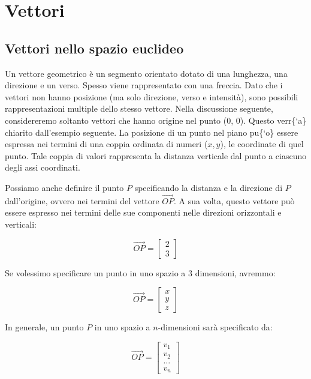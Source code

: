 \documentclass[
  11pt,
]{krantz}
\theoremstyle{definition}
\theoremstyle{definition}
\theoremstyle{definition}
\theoremstyle{definition}
\theoremstyle{remark}
\begin{document}
\hypertarget{vettori}{%
\section{Vettori}\label{vettori}}

\hypertarget{vettori-nello-spazio-euclideo}{%
\subsection{Vettori nello spazio euclideo}\label{vettori-nello-spazio-euclideo}}

Un vettore geometrico è un segmento orientato dotato di una lunghezza, una direzione e un verso. Spesso viene rappresentato con una freccia. Dato che i vettori non hanno posizione (ma solo direzione, verso e intensità), sono possibili rappresentazioni multiple dello stesso vettore. Nella discussione seguente, considereremo soltanto vettori che hanno origine nel punto (0, 0). Questo verr\{`a\} chiarito dall'esempio seguente. La posizione di un punto nel piano pu\{`o\} essere espressa nei termini di una coppia ordinata di numeri (\(x, y\)), le coordinate di quel punto. Tale coppia di valori rappresenta la distanza verticale dal punto a ciascuno degli assi coordinati.

Possiamo anche definire il punto \(P\) specificando la distanza e la direzione di \(P\) dall'origine, ovvero nei termini del vettore \(\overrightarrow{OP}\). A sua volta, questo vettore può essere espresso nei termini delle sue componenti nelle direzioni orizzontali e verticali:

\[
\overrightarrow{OP} = \left[ \begin{array}{c}
2\\
3
\end{array}
 \right]
\]

Se volessimo specificare un punto in uno spazio a 3 dimensioni, avremmo:

\[
\overrightarrow{OP} = \left[ \begin{array}{c}
x\\
y\\
z
\end{array}
\right]
\]

In generale, un punto \(P\) in uno spazio a \(n\)-dimensioni sarà specificato da:

\[\overrightarrow{OP} = \left[ \begin{array}{c}
v_1\\
v_2\\
\dots\\
v_n
\end{array}
 \right]\]
\end{document}
